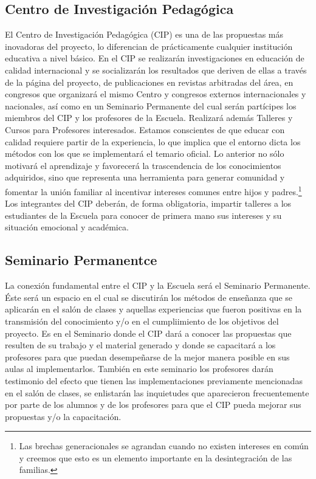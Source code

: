\documentclass[10pt,letterpaper]{report}
\begin{document}
\subsection{Centro de Investigación Pedagógica}
El Centro de Investigación Pedagógica (CIP) es una de las propuestas más inovadoras del proyecto, lo diferencian de prácticamente cualquier institución educativa a nivel básico. En el CIP se realizarán investigaciones en educación de calidad internacional y se socializarán los resultados que deriven de ellas a través de la página del proyecto, de publicaciones en revistas arbitradas del área, en congresos que organizará el mismo Centro y congresos externos internacionales y nacionales, así como en un Seminario Permanente del cual serán partícipes los miembros del CIP y los profesores de la Escuela. Realizará además Talleres y Cursos para Profesores interesados. Estamos conscientes de que educar con calidad requiere partir de la experiencia, lo que implica que el entorno dicta los métodos con los que se implementará el temario oficial. Lo anterior no sólo motivará el aprendizaje y favorecerá la trascendencia de los conocimientos adquiridos, sino que representa una herramienta para generar comunidad y fomentar la unión familiar al incentivar intereses comunes entre hijos y padres.\footnote{Las brechas generacionales se agrandan cuando no existen intereses en común y creemos que esto es un elemento importante en la desintegración de las familias.} Los integrantes del CIP deberán, de forma obligatoria, impartir talleres a los estudiantes de la Escuela para conocer de primera mano sus intereses y su situación emocional y académica.
\subsection{Seminario Permanentce}
La conexión fundamental entre el CIP y la Escuela será el Seminario Permanente. Éste será un espacio en el cual se discutirán los métodos de enseñanza que se aplicarán en el salón de clases y aquellas experiencias que fueron positivas en la transmisión del conocimiento y/o en el cumpliimiento de los objetivos del proyecto. Es en el Seminario donde el CIP dará a conocer las propuestas que resulten de su trabajo y el material generado y donde se capacitará a los profesores para que puedan desempeñarse de la mejor manera posible en sus aulas al implementarlos. También en este seminario los profesores darán testimonio del efecto que tienen las implementaciones previamente mencionadas en el salón de clases, se enlistarán las inquietudes que aparecieron frecuentemente por parte de los alumnos y de los profesores para que el CIP pueda mejorar sus propuestas y/o la capacitación.
\end{document}
